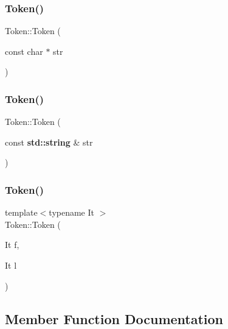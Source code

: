 \mbox{\label{class_token_a14690319b7df185a3899d4b2aedb59dc}} 
\subsubsection{\texorpdfstring{Token()}{Token()}\hspace{0.1cm}{\footnotesize\ttfamily [4/6]}}
{\footnotesize\ttfamily Token\+::\+Token (\begin{DoxyParamCaption}\item[{const char $\ast$}]{str }\end{DoxyParamCaption})}

\mbox{\label{class_token_a213c87418a6ff6375ab2298ee93acf43}} 
\subsubsection{\texorpdfstring{Token()}{Token()}\hspace{0.1cm}{\footnotesize\ttfamily [5/6]}}
{\footnotesize\ttfamily Token\+::\+Token (\begin{DoxyParamCaption}\item[{const \textbf{ std\+::string} \&}]{str }\end{DoxyParamCaption})}

\mbox{\label{class_token_a3b8654007e4cd9b3074dbe8300cf67bf}} 
\subsubsection{\texorpdfstring{Token()}{Token()}\hspace{0.1cm}{\footnotesize\ttfamily [6/6]}}
{\footnotesize\ttfamily template$<$typename It $>$ \\
Token\+::\+Token (\begin{DoxyParamCaption}\item[{It}]{f,  }\item[{It}]{l }\end{DoxyParamCaption})\hspace{0.3cm}{\ttfamily [inline]}}



\subsection{Member Function Documentation}
\mbox{\label{class_token_a6dd181cd1f4570aff7d7ddd5714ca582}} 
